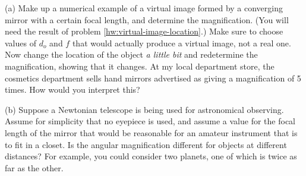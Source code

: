 (a) Make up a numerical example of a virtual image formed
by a converging mirror with a certain focal length, and
determine the magnification. (You will need the result of
problem \ref{hw:virtual-image-location}.) Make sure to choose values of $d_o$ and $f$ that
would actually produce a virtual image, not a real one. Now
change the location of the object \emph{a little bit} and
redetermine the magnification, showing that it changes. At
my local department store, the cosmetics department sells
hand mirrors advertised as giving a magnification of 5 times. How
would you interpret this?

(b) Suppose a Newtonian telescope is being used for
astronomical observing. Assume for simplicity that no
eyepiece is used, and assume a value for the focal length of
the mirror that would be reasonable for an amateur
instrument that is to fit in a closet. Is the angular
magnification different for objects at different distances?
For example, you could consider two planets, one of which is
twice as far as the other.
